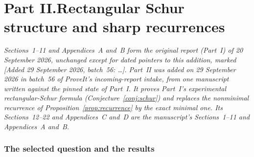 \documentclass[11pt]{article}
\theoremstyle{definition}
\theoremstyle{remark}
\theoremstyle{definition}
\theoremstyle{plain}
\numberwithin{equation}{section}
\begin{document}
\clearpage
\renewcommand{\thesection}{\arabic{section}}
\renewcommand{\theHsection}{rs.\arabic{section}}
\setcounter{section}{11}
\setlength{\emergencystretch}{3em}
\makeatletter\g@addto@macro\UrlBreaks{\do\-}\makeatother
{}\part*{Part II.\quad Rectangular Schur structure and sharp recurrences}

\noindent\emph{Sections~1--11 and Appendices~A and~B form the original
report (Part~I) of 20 September 2026, unchanged except for dated pointers to
this addition, marked \textup{[Added 29 September 2026, batch~56: \dots]}.
Part~II was added on 29 September 2026 in batch~56 of ProveIt's
incoming-report intake, from one manuscript written against the pinned state
of Part~I. It proves Part~I's experimental rectangular-Schur formula
(Conjecture~\ref{conj:schur}) and replaces the nonminimal recurrence of
Proposition~\ref{prop:recurrence} by the exact minimal one. Its
Sections~12--22 and Appendices~C and~D are the manuscript's Sections~1--11
and Appendices~A and~B.}

\section{The selected question and the results}
\label{rs:sec:intro}
\end{document}
